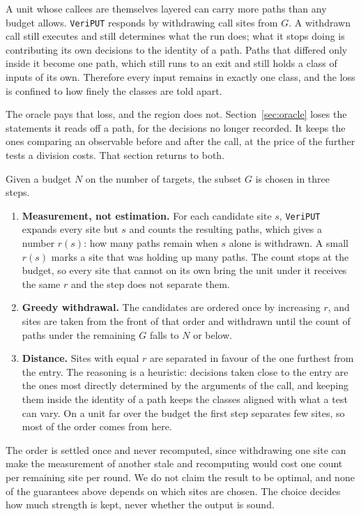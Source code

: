 \documentclass[manuscript,anonymous]{acmart}
\newcommand{\tool}[1]{\texttt{#1}}
\begin{document}
A unit whose callees are themselves layered can carry more paths than any budget
allows. \tool{VeriPUT} responds by withdrawing call sites from $G$. A withdrawn
call still executes and still determines what the run does; what it stops doing
is contributing its own decisions to the identity of a path. Paths that differed
only inside it become one path, which still runs to an exit and still holds a
class of inputs of its own. Therefore every input remains in exactly one class,
and the loss is confined to how finely the classes are told apart.

The oracle pays that loss, and the region does not. Section~\ref{sec:oracle}
loses the statements it reads off a path, for the decisions no longer recorded.
It keeps the ones comparing an observable before and after the call, at the
price of the further tests a division costs. That section returns to both.

Given a budget $N$ on the number of targets, the subset $G$ is chosen in three
steps.

\begin{enumerate}
\item \textbf{Measurement, not estimation.} For each candidate site $s$,
\tool{VeriPUT} expands every site but $s$ and counts the resulting paths, which
gives a number $r(s)$: how many paths remain when $s$ alone is withdrawn. A
small $r(s)$ marks a site that was holding up many paths. The count stops at the
budget, so every site that cannot on its own bring the unit under it receives
the same $r$ and the step does not separate them.
\item \textbf{Greedy withdrawal.} The candidates are ordered once by increasing
$r$, and sites are taken from the front of that order and withdrawn until the
count of paths under the remaining $G$ falls to $N$ or below.
\item \textbf{Distance.} Sites with equal $r$ are separated in favour of the one
furthest from the entry. The reasoning is a heuristic: decisions taken close to
the entry are the ones most directly determined by the arguments of the call,
and keeping them inside the identity of a path keeps the classes aligned with
what a test can vary. On a unit far over the budget the first step separates
few sites, so most of the order comes from here.
\end{enumerate}

The order is settled once and never recomputed, since withdrawing one site can
make the measurement of another stale and recomputing would cost one count per
remaining site per round. We do not claim the result to be optimal, and none of
the guarantees above depends on which sites are chosen. The choice decides how
much strength is kept, never whether the output is sound.
\end{document}
